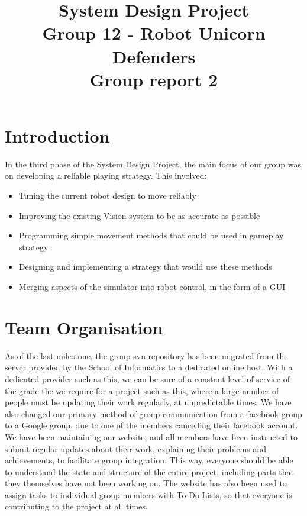 \documentclass[conference,12pt]{IEEEtran}
\begin{document}
	
\title{System Design Project
	\\Group 12 - Robot Unicorn Defenders
	\\Group report 2}

\author{
}
	
\maketitle
{}
\IEEEpeerreviewmaketitle

\pagebreak
	
\section{Introduction}
\vspace{-2 mm}
In the third phase of the System Design Project, the main focus of our group was on developing a reliable playing strategy. This involved:
\begin{itemize}
\item Tuning the current robot design to move reliably
\item Improving the existing Vision system to be as accurate as possible
\item Programming simple movement methods that could be used in gameplay strategy
\item Designing and implementing a strategy that would use these methods 
\item Merging aspects of the simulator into robot control, in the form of a GUI
\end{itemize}
\vspace{-2 mm}
\section{Team Organisation}
\vspace{-2 mm}
As of the last milestone, the group svn repository has been migrated from the server provided by the School of Informatics to a dedicated online host. With a dedicated provider such as this, we can be sure of a constant level of service of the grade the we require for a project such as this, where a large number of people must be updating their work regularly, at unpredictable times.  We have also changed our primary method of group communication from a facebook group to a Google group, due to one of the members cancelling their facebook account.
We have been maintaining our website, and all members have been instructed to submit  regular updates about their work, explaining their problems and achievements, to facilitate group integration. This way, everyone should be able to understand the state and structure of the entire project, including parts that they themselves have not been working on. The website has also been used to assign tasks to individual group members with To-Do Lists, so that everyone is contributing to the project at all times. 
\vspace{-2 mm}
\end{document}
